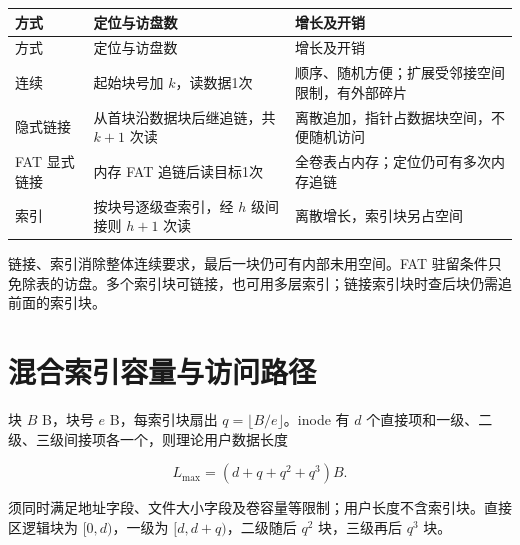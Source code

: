 \par\smallskip
\begin{wideblock}
{\fontsize{9.3}{12}\selectfont\setlength{\tabcolsep}{2.5pt}\setlength{\LTleft}{0pt}\setlength{\LTright}{0pt}
\begin{longtable}{@{}>{\raggedright\arraybackslash}p{}>{\raggedright\arraybackslash}p{}>{\raggedright\arraybackslash}p{}@{}}
\toprule
方式 & 定位与访盘数 & 增长及开销 \\

\midrule\endfirsthead\toprule
方式 & 定位与访盘数 & 增长及开销 \\

\midrule\endhead\bottomrule\endfoot
连续 & 起始块号加 \(k\)，读数据1次 & 顺序、随机方便；扩展受邻接空间限制，有外部碎片 \\

隐式链接 & 从首块沿数据块后继追链，共 \(k+1\) 次读 & 离散追加，指针占数据块空间，不便随机访问 \\

FAT 显式链接 & 内存 FAT 追链后读目标1次 & 全卷表占内存；定位仍可有多次内存追链 \\

索引 & 按块号逐级查索引，经 \(h\) 级间接则 \(h+1\) 次读 & 离散增长，索引块另占空间 \\

\end{longtable}}
\end{wideblock}
\par\smallskip

链接、索引消除整体连续要求，最后一块仍可有内部未用空间。FAT 驻留条件只免除表的访盘。多个索引块可链接，也可用多层索引；链接索引块时查后块仍需追前面的索引块。

\section{混合索引容量与访问路径}\label{OS04-mixed-index}

块 \(B\) B，块号 \(e\) B，每索引块扇出 \(q=\lfloor B/e\rfloor\)。inode 有 \(d\) 个直接项和一级、二级、三级间接项各一个，则理论用户数据长度

\[L_{\max}=(d+q+q^2+q^3)B.\]

须同时满足地址字段、文件大小字段及卷容量等限制；用户长度不含索引块。直接区逻辑块为 \([0,d)\)，一级为 \([d,d+q)\)，二级随后 \(q^2\) 块，三级再后 \(q^3\) 块。

